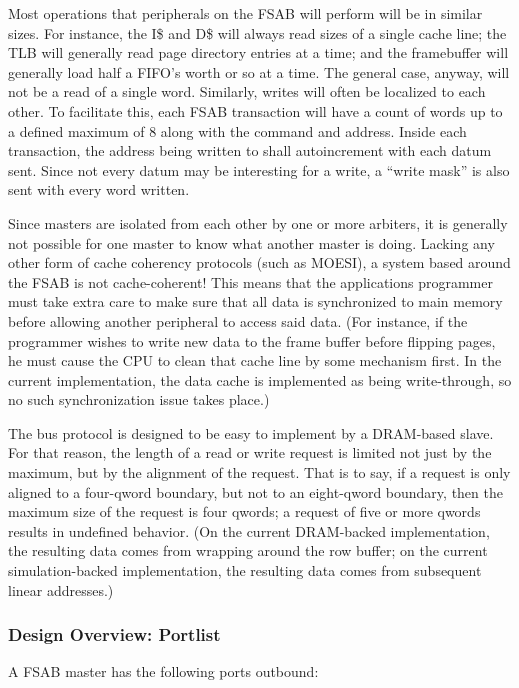 \documentclass[10pt]{article}
\begin{document}
Most operations that peripherals on the FSAB will perform will be in similar 
sizes. For instance, the I\$ and D\$ will always read sizes of a single cache 
line; the TLB will generally read page directory entries at a time; and the 
framebuffer will generally load half a FIFO's worth or so at a time. The 
general case, anyway, will not be a read of a single word. Similarly, writes 
will often be localized to each other. To facilitate this, each FSAB 
transaction will have a count of words up to a defined maximum of 8 along with 
the command and address. Inside each transaction, the address being written to 
shall autoincrement with each datum sent. Since not every datum may be 
interesting for a write, a ``write mask'' is also sent with every word written.

Since masters are isolated from each other by one or more arbiters, it is
generally not possible for one master to know what another master is doing.
Lacking any other form of cache coherency protocols (such as MOESI), a
system based around the FSAB is not cache-coherent! This means that the
applications programmer must take extra care to make sure that all data is
synchronized to main memory before allowing another peripheral to access
said data. (For instance, if the programmer wishes to write new data to the
frame buffer before flipping pages, he must cause the CPU to clean that
cache line by some mechanism first. In the current implementation, the data
cache is implemented as being write-through, so no such synchronization
issue takes place.)

The bus protocol is designed to be easy to implement by a DRAM-based slave. 
For that reason, the length of a read or write request is limited not just by 
the maximum, but by the alignment of the request. That is to say, if a request 
is only aligned to a four-qword boundary, but not to an eight-qword boundary, 
then the maximum size of the request is four qwords; a request of five or more 
qwords results in undefined behavior. (On the current DRAM-backed 
implementation, the resulting data comes from wrapping around the row buffer; 
on the current simulation-backed implementation, the resulting data comes from 
subsequent linear addresses.) 

\subsubsection{Design Overview: Portlist}

A FSAB master has the following ports outbound:
\end{document}

